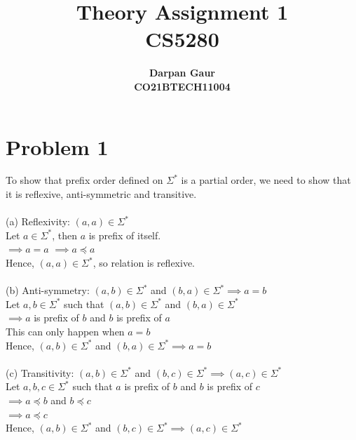 \documentclass[12pt]{article}
\title{
    \textbf{Theory Assignment 1} \\ 
    \textbf{CS5280} \\
}
\author{
    \textbf{Darpan Gaur} \\
    \textbf{CO21BTECH11004}
}
\date{}
\begin{document}
\maketitle

\hrulefill

\section*{Problem 1}
To show that prefix order defined on $ \Sigma^* $ is a partial order, we need to show that it is reflexive, anti-symmetric and transitive. \\
\\
(a) Reflexivity: $ (a, a) \in \Sigma^* $ \\
Let $ a \in \Sigma^* $, then $ a $ is prefix of itself. \\
$ \implies a = a $ \quad $ \implies a \preceq a $ \\
Hence, $ (a, a) \in \Sigma^* $, so relation is reflexive. \\
\\
(b) Anti-symmetry: $ (a, b) \in \Sigma^* $ and $ (b, a) \in \Sigma^* \implies a = b $ \\
Let $ a, b \in \Sigma^* $ such that $ (a, b) \in \Sigma^* $ and $ (b, a) \in \Sigma^* $ \\
$ \implies a $ is prefix of $ b $ and $ b $ is prefix of $ a $ \\
This can only happen when $ a = b $ \\
Hence, $ (a, b) \in \Sigma^* $ and $ (b, a) \in \Sigma^* \implies a = b $ \\
\\
(c) Transitivity: $ (a, b) \in \Sigma^* $ and $ (b, c) \in \Sigma^* \implies (a, c) \in \Sigma^* $ \\
Let $ a, b, c \in \Sigma^* $ such that $ a $ is prefix of $ b $ and $ b $ is prefix of $ c $ \\
$ \implies a \preceq b $ and $ b \preceq c $ \\
$ \implies a \preceq c $ \\
Hence, $ (a, b) \in \Sigma^* $ and $ (b, c) \in \Sigma^* \implies (a, c) \in \Sigma^* $ \\
\end{document}

